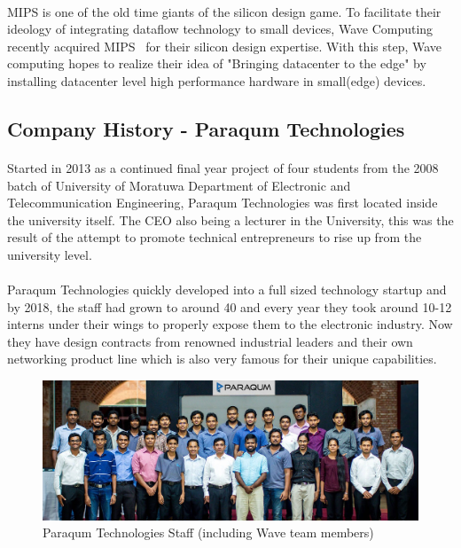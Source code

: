 \paragraph{}
MIPS is one of the old time giants of the silicon design game. To facilitate their ideology of integrating dataflow technology to small devices, Wave Computing recently acquired MIPS~\cite{mipsaq} for their silicon design expertise. With this step, Wave computing hopes to realize their idea of "Bringing datacenter to the edge" by installing datacenter level high performance hardware in small(edge) devices.

\subsection{Company History - Paraqum Technologies}
\paragraph{}
Started in 2013 as a continued final year project of four students from the 2008 batch of University of Moratuwa Department of Electronic and Telecommunication Engineering, Paraqum Technologies was first located inside the university itself. The CEO also being a lecturer in the University, this was the result of the attempt to promote technical entrepreneurs to rise up from the university level.

\paragraph{}
Paraqum Technologies quickly developed into a full sized technology startup and by 2018, the staff had grown to around 40 and every year they took around 10-12 interns under their wings to properly expose them to the electronic industry. Now they have design contracts from renowned industrial leaders and their own networking product line which is also very famous for their unique capabilities.

\begin{figure}[H]
    \centering
    \includegraphics[trim=0cm 0cm 0cm 0cm, clip=true,scale=0.25]{figures/paraqum_team.jpg}
    \caption{Paraqum Technologies Staff (including Wave team members)~\cite{pqmintro} \label{Fig:pqmteam}}\vspace{-4mm}
    \end{figure}

